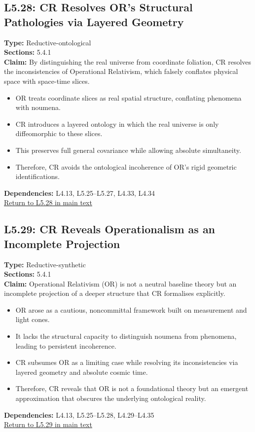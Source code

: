 \documentclass[12pt]{book}
\newcommand{\returnlink}[1]{\hyperref[logic:#1]{Return to #1 in main text}\xspace}
\begin{document}
\subsection*{L5.28: CR Resolves OR's Structural Pathologies via Layered Geometry}
\label{appendix:L5.28}
\textbf{Type:} Reductive-ontological \\
\textbf{Sections:} 5.4.1 \\
\textbf{Claim:} By distinguishing the real universe from coordinate foliation, CR resolves the inconsistencies of Operational Relativism, which falsely conflates physical space with space-time slices.
\begin{itemize}
  \item OR treats coordinate slices as real spatial structure, conflating phenomena with noumena.
  \item CR introduces a layered ontology in which the real universe is only diffeomorphic to these slices.
  \item This preserves full general covariance while allowing absolute simultaneity.
  \item Therefore, CR avoids the ontological incoherence of OR's rigid geometric identifications.
\end{itemize}
\textbf{Dependencies:} L4.13, L5.25–L5.27, L4.33, L4.34 \\
\returnlink{L5.28}

\subsection*{L5.29: CR Reveals Operationalism as an Incomplete Projection}
\label{appendix:L5.29}
\textbf{Type:} Reductive-synthetic \\
\textbf{Sections:} 5.4.1 \\
\textbf{Claim:} Operational Relativism (OR) is not a neutral baseline theory but an incomplete projection of a deeper structure that CR formalises explicitly.
\begin{itemize}
  \item OR arose as a cautious, noncommittal framework built on measurement and light cones.
  \item It lacks the structural capacity to distinguish noumena from phenomena, leading to persistent incoherence.
  \item CR subsumes OR as a limiting case while resolving its inconsistencies via layered geometry and absolute cosmic time.
  \item Therefore, CR reveals that OR is not a foundational theory but an emergent approximation that obscures the underlying ontological reality.
\end{itemize}
\textbf{Dependencies:} L4.13, L5.25–L5.28, L4.29–L4.35 \\
\returnlink{L5.29}
\end{document}
